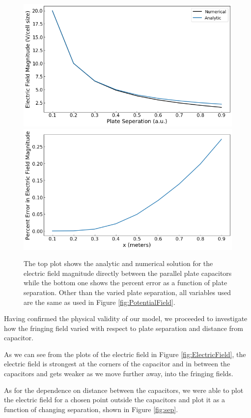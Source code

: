 \documentclass{report}
\begin{document}
            \begin{figure}[t]
                \centering
                \includegraphics[width=0.48\linewidth]{images/NumericalAnalytic.png}
                \includegraphics[width=0.49\linewidth]{images/PercentErrorSep.png}
                \caption{The top plot shows the analytic and numerical solution for the electric field magnitude directly between the parallel plate capacitors while the bottom one shows the percent error as a function of plate separation. Other than the varied plate separation, all variables used are the same as used in Figure \ref{fig:PotentialField}.}
                \label{fig:compare}
            \end{figure}
            
            Having confirmed the physical validity of our model, we proceeded to investigate how the fringing field varied with respect to plate separation and distance from capacitor.
        
            As we can see from the plots of the electric field in Figure \ref{fig:ElectricField}, the electric field is strongest at the corners of the capacitor and in between the capacitors and gets weaker as we move further away, into the fringing fields. 
            
            As for the dependence on distance between the capacitors, we were able to plot the electric field for a chosen point outside the capacitors and plot it as a function of changing separation, shown in Figure \ref{fig:sep}.
            
\end{document}
